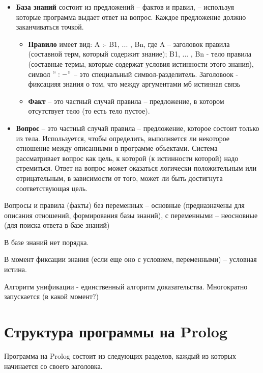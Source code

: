 \documentclass[12pt]{report}
\begin{document}
\begin{itemize}
	\item \textbf{База знаний} состоит из предложений -- фактов и правил, -- используя которые программа выдает ответ на вопрос. Каждое предложение  должно заканчиваться точкой.
	\begin{itemize}
		\item \textbf{Правило} имеет вид: A :- B1, ... , Bn, где A -- заголовок правила (составной терм, который содержит знание); B1, ... , Bn - тело правила (составные термы, которые содержат условия истинности этого знания), символ $":-"$ -- это специальный символ-разделитель. Заголовоок - фиксацияя знания о том, что между аргументами мб истинная связь
		\item \textbf{Факт} -- это частный случай правила -- предложение, в котором отсутствует тело (то есть тело пустое).
	\end{itemize}
	\item \textbf{Вопрос} -- это частный случай правила -- предложение, которое состоит только из тела. Используется, чтобы определить, выполняется ли некоторое отношение между описанными в программе объектами. Система рассматривает вопрос как цель, к которой (к истинности которой) надо стремиться. Ответ на вопрос может оказаться логически положительным или отрицательным, в зависимости от того, может ли быть достигнута соответствующая цель.
\end{itemize}

Вопросы и правила (факты) без переменных -- основные (предназначены для описания отношений, формирования базы знаний), с переменными -- неосновные (для поиска ответа в базе знаний)


В базе знаний нет порядка.

В момент фиксации знания (если еще оно с условием, переменными)  --  условная истина.


Алгоритм унификации - единственный алгоритм доказательства. Многократно запускается (в какой момент?)










\section{Структура программы на Prolog}

Программа на Prolog состоит из следующих разделов, каждый из которых начинается со своего заголовка.
\end{document}
